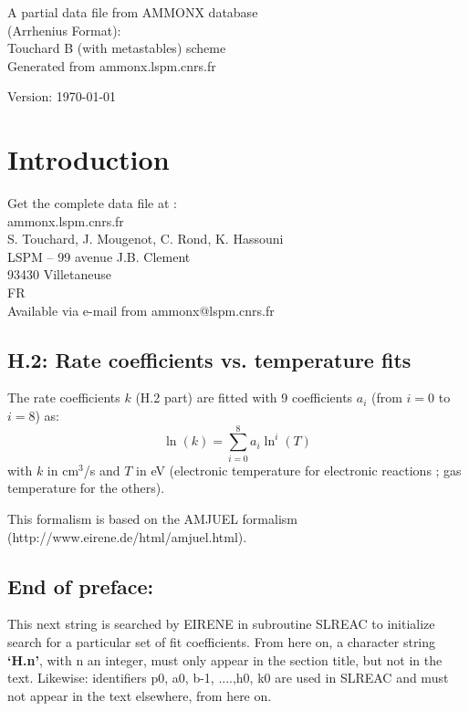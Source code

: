 \documentclass[12pt]{article}
\begin{document}
\parindent 0pt
{\Large \bf \center
\vspace*{3truecm}

A partial data file from AMMONX database \\(Arrhenius Format):\\
Touchard B (with metastables) scheme\\Generated from ammonx.lspm.cnrs.fr
\vspace*{3truecm}

Version: \today

}
\newpage
\tableofcontents
\newpage
\section*{Introduction}

Get the complete data file at :\\
ammonx.lspm.cnrs.fr\\
S. Touchard, J. Mougenot, C. Rond, K. Hassouni\\
LSPM -- 99 avenue J.B. Clement\\
93430 Villetaneuse \\
FR\\
Available via e-mail from ammonx@lspm.cnrs.fr

\subsection*{H.2: Rate coefficients vs. temperature fits}
The rate coefficients $k$ (H.2 part) are fitted with 9 coefficients $a_i$ (from $i=0$ to $i=8$) as:
\begin{equation}
\ln(k) = \sum_{i=0}^8  a_i \ln^i(T)
\end{equation}
with $k$ in cm$^3$/s and $T$ in eV (electronic temperature for electronic reactions ; gas temperature for the others).

This formalism is based on the AMJUEL formalism (http://www.eirene.de/html/amjuel.html).

\subsection*{End of preface:}
This next string is searched by EIRENE in subroutine SLREAC
to initialize search for a particular set of fit coefficients.
From here on, a character string \textbf{`H.n'}, with n an integer, must only appear in the
section title,
but not in the text. Likewise: identifiers p0, a0, b-1, ....,h0, k0 are used
in SLREAC and must not
appear in the text elsewhere, from here on.
\end{document}
